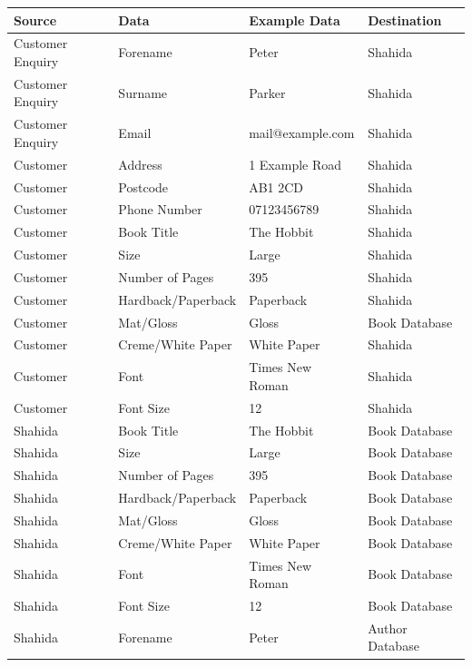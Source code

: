 \begin{center}
\begin{tabular}{|p{3.5cm}|p{3.5cm}|p{3cm}|p{3cm}|}
    \hline
    \textbf{Source} & \textbf{Data} & \textbf{Example Data} & \textbf{Destination} \\ \hline
    Customer Enquiry & Forename & Peter & Shahida  \\ \hline
    Customer Enquiry & Surname & Parker & Shahida  \\ \hline
    Customer Enquiry & Email & mail@example.com & Shahida  \\ \hline
    Customer & Address & 1 Example Road & Shahida  \\ \hline
    Customer & Postcode & AB1 2CD & Shahida  \\ \hline
    Customer & Phone Number & 07123456789 & Shahida  \\ \hline
    Customer & Book Title & The Hobbit & Shahida \\  \hline
    Customer & Size & Large & Shahida \\  \hline
    Customer & Number of Pages & 395 & Shahida \\  \hline
    Customer & Hardback/Paperback & Paperback & Shahida \\  \hline
    Customer & Mat/Gloss & Gloss & Book Database \\  \hline
    Customer & Creme/White Paper & White Paper & Shahida \\  \hline
    Customer & Font & Times New Roman & Shahida \\  \hline
    Customer & Font Size & 12 & Shahida \\  \hline
    Shahida & Book Title & The Hobbit & Book Database \\  \hline
    Shahida & Size & Large & Book Database \\  \hline
    Shahida & Number of Pages & 395 & Book Database \\  \hline
    Shahida & Hardback/Paperback & Paperback & Book Database \\  \hline
    Shahida & Mat/Gloss & Gloss & Book Database \\  \hline
    Shahida & Creme/White Paper & White Paper & Book Database \\  \hline
    Shahida & Font & Times New Roman & Book Database \\  \hline
    Shahida & Font Size & 12 & Book Database \\  \hline
    Shahida & Forename & Peter & Author Database  \\ \hline

\end{tabular}
\end{center}
